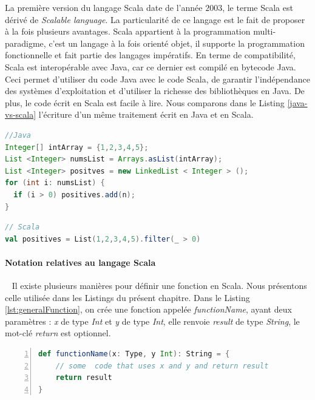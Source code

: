 La première version du langage Scala date de l'année $2003$, le terme  Scala  est dérivé de \textit{Scalable language}. 
La particularité de ce langage est le fait de proposer à la fois plusieurs avantages. Scala appartient à la 
programmation multi-paradigme, c'est  un langage à la fois orienté objet, il supporte la programmation fonctionnelle et fait partie des langages impératifs. En terme de compatibilité, Scala est interopérable avec  Java, car ce dernier est compilé en bytecode Java. Ceci permet d'utiliser du code Java avec le code Scala, de garantir l'indépendance des systèmes d'exploitation et d'utiliser la richesse des bibliothèques en Java. De plus, le code écrit en Scala est facile à lire.
Nous comparons dans le Listing \ref{java-vs-scala} l'écriture d'un même traitement écrit en Java et en Scala.
\begin{center}
	\begin{minipage}[t]{.50\textwidth}
\begin{lstlisting}[language=java, basicstyle=\small]
//Java
Integer[] intArray = {1,2,3,4,5};
List <Integer> numsList = Arrays.asList(intArray);
List <Integer> positves = new LinkedList < Integer > ();
for (int i: numsList) {
  if (i > 0) positives.add(n);
}
\end{lstlisting}
	\end{minipage}\hfill
	\begin{minipage}[t]{.49\textwidth}
\begin{lstlisting}[language=scala, basicstyle=\small]
// Scala 
val positives = List(1,2,3,4,5).filter(_ > 0)
\end{lstlisting}
	\end{minipage}
	\label{java-vs-scala}
\end{center}

\paragraph{Notation relatives au langage Scala}~
Il existe plusieurs manières pour définir une fonction en Scala. Nous présentons celle utilisée dans les Listings du présent chapitre. Dans le Listing \ref{lst:generalFunction}, on crée une fonction appelée  \textit{functionName}, ayant deux paramètres : \textit{x} de type \textit{Int} et \textit{y} de type \textit{Int}, elle renvoie \textit{result} de type \textit{String}, le mot-clé \textit{return} est optionnel.  
\begin{lstlisting}[language=scala,firstnumber=1, caption={Exemple d'une fonction en  Scala}, label={lst:generalFunction}, basicstyle = \footnotesize,escapechar=|,numbers=left,
stepnumber=1,numberstyle=\scriptsize]
def functionName(x: Type, y Int): String = {
	// some  code that uses x and y and return result
	return result 
}
\end{lstlisting} \par

